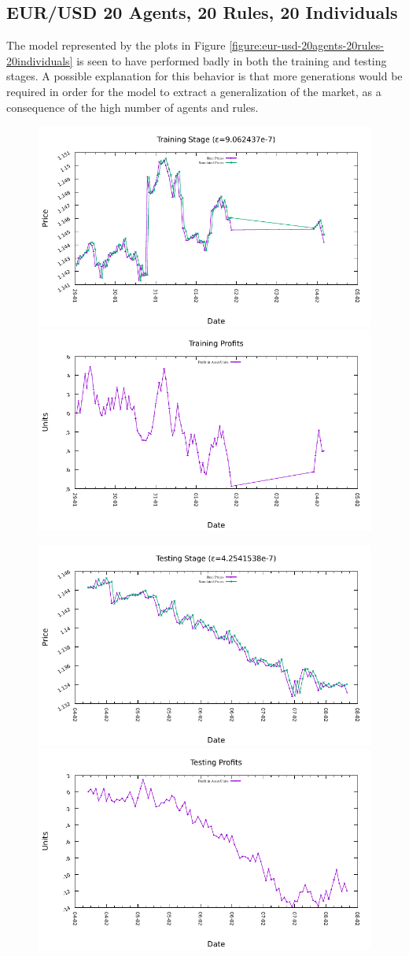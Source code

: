 \newpage

\subsection{EUR/USD 20 Agents, 20 Rules, 20 Individuals}
\label{results:forecast-eur-usd-20agents-20rules-20individuals}

The model represented by the plots in Figure
\ref{figure:eur-usd-20agents-20rules-20individuals} is seen to have performed
badly in both the training and testing stages. A possible explanation for this
behavior is that more generations would be required in order for the model to
extract a generalization of the market, as a consequence of the high number of
agents and rules.

\begin{figure}[htp]
  \centering

  \includegraphics[width=.45\textwidth]{img/plots/eur_usd_h1-20agents-20rules-20ind-100gen_training_fit.pdf}\quad
  \includegraphics[width=.45\textwidth]{img/plots/eur_usd_h1-20agents-20rules-20ind-100gen_training_profits.pdf}

  \medskip

  \includegraphics[width=.45\textwidth]{img/plots/eur_usd_h1-20agents-20rules-20ind-100gen_testing_fit.pdf}\quad
  \includegraphics[width=.45\textwidth]{img/plots/eur_usd_h1-20agents-20rules-20ind-100gen_testing_profits.pdf}


\end{figure}

